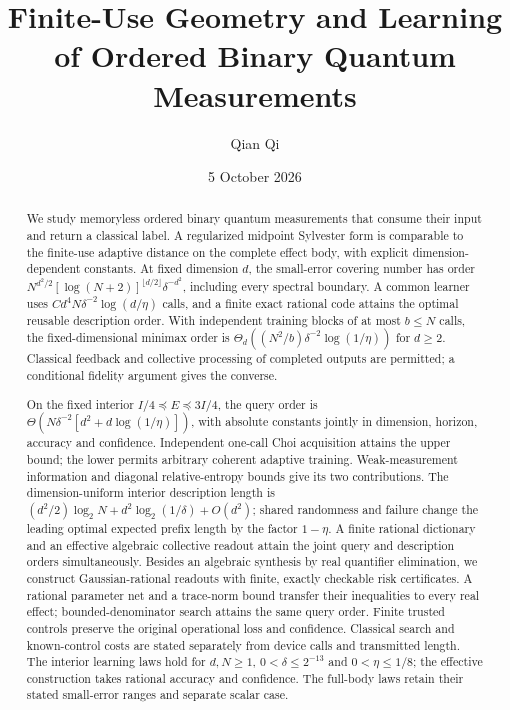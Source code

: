 \documentclass[11pt]{amsart}
\title[Finite-use measurement geometry and learning]{Finite-Use Geometry and Learning of Ordered Binary Quantum Measurements}
\author{Qian Qi}
\date{5 October 2026}
\numberwithin{equation}{section}
\theoremstyle{definition}\newtheorem{definition}[theorem]{Definition}
\theoremstyle{remark}\newtheorem{remark}[theorem]{Remark}
\begin{document}
\raggedbottom
\begin{abstract}
We study memoryless ordered binary quantum measurements that consume
their input and return a classical label.  A regularized midpoint
Sylvester form is comparable to the finite-use adaptive distance on
the complete effect body, with explicit dimension-dependent constants.
At fixed dimension $d$, the small-error covering number has order
\mbox{$N^{d^2/2}[\log(N+2)]^{\lfloor d/2\rfloor}\delta^{-d^2}$},
including every spectral boundary.
A common learner uses $Cd^4N\delta^{-2}\log(d/\eta)$ calls, and a
finite exact rational code attains the optimal reusable description
order.  With independent training blocks of at most $b\le N$
calls, the fixed-dimensional minimax order is
$\Theta_d((N^2/b)\delta^{-2}\log(1/\eta))$ for $d\ge2$.
Classical feedback and collective processing of completed outputs
are permitted; a conditional fidelity argument gives the converse.

On the fixed interior $I/4\preceq E\preceq3I/4$, the query order is
\mbox{$\Theta(N\delta^{-2}[d^2+d\log(1/\eta)])$},
with absolute constants jointly in dimension, horizon, accuracy and
confidence.  Independent one-call Choi acquisition attains the upper
bound; the lower permits arbitrary coherent adaptive training.
Weak-measurement information and diagonal relative-entropy bounds
give its two contributions.  The dimension-uniform interior
description length is
$(d^2/2)\log_2N+d^2\log_2(1/\delta)+O(d^2)$;
shared randomness and failure change the leading optimal expected
prefix length by the factor $1-\eta$.
A finite rational dictionary and an effective algebraic collective
readout attain the joint query and description orders simultaneously.
Besides an algebraic synthesis by real quantifier elimination, we
construct Gaussian-rational readouts with finite, exactly checkable
risk certificates.  A rational parameter net and a trace-norm bound
transfer their inequalities to every real effect; bounded-denominator
search attains the same query order.  Finite trusted controls preserve
the original operational loss and confidence.  Classical search and known-control costs are stated
separately from device calls and transmitted length.
The interior learning laws hold for $d,N\ge1$,
$0<\delta\le2^{-13}$ and $0<\eta\le1/8$; the effective
construction takes rational accuracy and confidence.
The full-body laws retain their stated small-error ranges and
separate scalar case.
\end{abstract}
\maketitle
\end{document}
